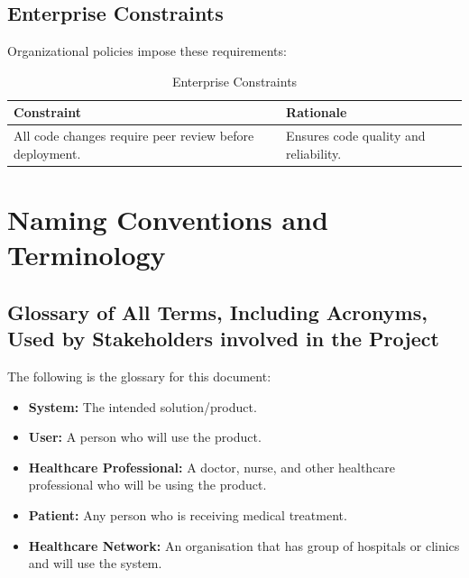 \documentclass[12pt]{article}
\begin{document}
\subsection{Enterprise Constraints}
Organizational policies impose these requirements:

\begin{table}[H]
\centering
\begin{tabular}{|p{6cm}|p{6cm}|}
\hline
\textbf{Constraint} & \textbf{Rationale} \\
\hline
All code changes require peer review before deployment. & Ensures code quality and reliability. \\
\hline
\end{tabular}
\caption{Enterprise Constraints}
\label{tab:enterprise_constraints}
\end{table}

\section{Naming Conventions and Terminology}

\subsection{Glossary of All Terms, Including Acronyms, Used by Stakeholders
involved in the Project}
The following is the glossary for this document:
\begin{itemize}
  \item \textbf{System:} The intended solution/product.
  \item \textbf{User:} A person who will use the product.
  \item \textbf{Healthcare Professional:} A doctor, nurse, and other healthcare professional who will be using the product.
  \item \textbf{Patient:} Any person who is receiving medical treatment.
  \item \textbf{Healthcare Network:} An organisation that has group of hospitals or clinics and will use the system.
\end{itemize}
\end{document}
